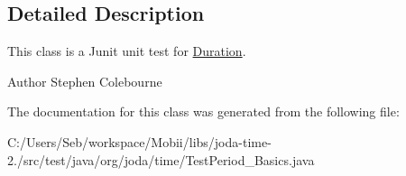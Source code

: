 \subsection{Detailed Description}
This class is a Junit unit test for \hyperlink{classorg_1_1joda_1_1time_1_1_duration}{Duration}.

\begin{DoxyAuthor}{Author}
Stephen Colebourne 
\end{DoxyAuthor}


The documentation for this class was generated from the following file\-:\begin{DoxyCompactItemize}
\item 
C\-:/\-Users/\-Seb/workspace/\-Mobii/libs/joda-\/time-\/2./src/test/java/org/joda/time/Test\-Period\-\_\-\-Basics.\-java\end{DoxyCompactItemize}
